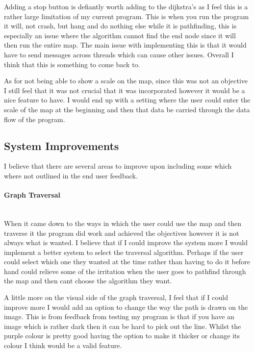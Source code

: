 \begin{FlushLeft}
    Adding a stop button is defiantly worth adding to the dijkstra's as I feel this is a rather large limitation of my current program. This is when you run the program it will, not crash, but hang and do nothing else while it is pathfinding, this is especially an issue where the algorithm cannot find the end node since it will then run the entire map. The main issue with implementing this is that it would have to send messages across threads which can cause other issues. Overall I think that this is something to come back to. \\ \bk

    As for not being able to show a scale on the map, since this was not an objective I still feel that it was not crucial that it was incorporated however it would be a nice feature to have. I would end up with a setting where the user could enter the scale of the map at the beginning and then that data be carried through the data flow of the program. \\ \bk

    \bk

    \subsection {System Improvements}
    I believe that there are several areas to improve upon including some which where not outlined in the end user feedback. \\ \bk

    \paragraph{Graph Traversal} \mbox{}\\
    When it came down to the ways in which the user could use the map and then traverse it the program did work and achieved the objectives however it is not always what is wanted. I believe that if I could improve the system more I would implement a better system to select the traversal algorithm. Perhaps if the user could select which one they wanted at the time rather than having to do it before hand could relieve some of the irritation when the user goes to pathfind through the map and then cant choose the algorithm they want. \\ \bk

    A little more on the visual side of the graph traversal, I feel that if I could improve more I would add an option to change the way the path is drawn on the image. This is from feedback from testing my program is that if you have an image which is rather dark then it can be hard to pick out the line. Whilst the purple colour is pretty good having the option to make it thicker or change its colour I think would be a valid feature. \\ \bk


\end{FlushLeft}
